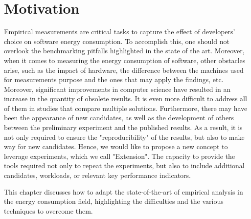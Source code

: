 
\section{Motivation}
Empirical measurements are critical tasks to capture the effect of developers' choice on software energy consumption.
To accomplish this, one should not overlook the benchmarking pitfalls highlighted in the state of the art.
Moreover, when it comes to measuring the energy consumption of software, other obstacles arise, such as the impact of hardware, the difference between the machines used for measurements purpose and the ones that may apply the findings, etc. 
Moreover, significant improvements in computer science have resulted in an increase in the quantity of obsolete results.
It is even more difficult to address all of them in studies that compare multiple solutions.
Furthermore, there may have been the appearance of new candidates, as well as the development of others between the preliminary experiment and the published results.
As a result, it is not only required to ensure the "reproducibility" of the results, but also to make way for new candidates.
Hence, we would like to propose a new concept to leverage experiments, which we call "Extension".
The capacity to provide the tools required not only to repeat the experiments, but also to include additional candidates, workloads, or relevant key performance indicators.

This chapter discusses how to adapt the state-of-the-art of empirical analysis in the energy consumption field, highlighting the difficulties and the various techniques to overcome them. 











